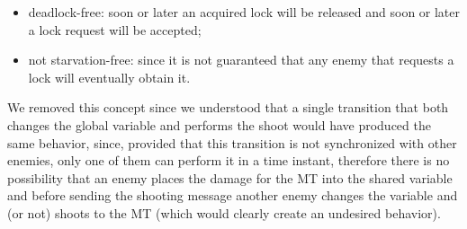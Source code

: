 \documentclass[
10pt, %
a4paper, %
oneside, %
headinclude,footinclude, %
BCOR5mm, %
]{scrartcl}
\begin{document}
			\begin{itemize}
				\item deadlock-free: soon or later an acquired lock will be released and soon or later a lock request will be accepted;
				\item not starvation-free: since it is not guaranteed that any enemy that requests a lock will eventually obtain it.
			\end{itemize}
			We removed this concept since we understood that a single transition that both changes the global variable and performs the shoot would have produced the same behavior, since, provided that this transition is not synchronized with other enemies, only one of them can perform it in a time instant, therefore there is no possibility that an enemy places the damage for the MT into the shared variable and before sending the shooting message another enemy changes the variable and (or not) shoots to the MT (which would clearly create an undesired behavior).
	\nocite{1,2,3,4,5,6,7}
	\printbibliography
\end{document}
